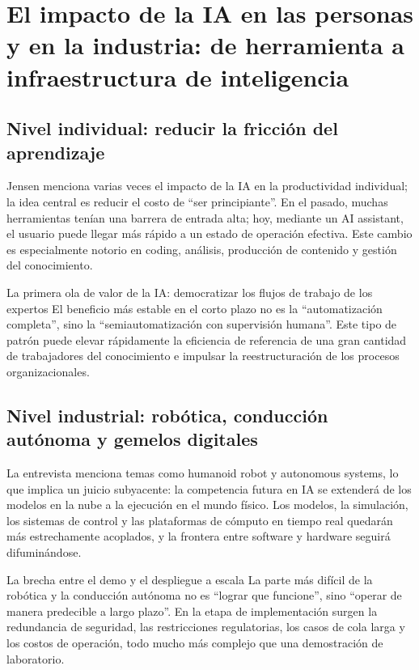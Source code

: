 \section{El impacto de la IA en las personas y en la industria: de herramienta a infraestructura de inteligencia}

\subsection{Nivel individual: reducir la fricción del aprendizaje}

Jensen menciona varias veces el impacto de la IA en la productividad individual; la idea central es reducir el costo de ``ser principiante''. En el pasado, muchas herramientas tenían una barrera de entrada alta; hoy, mediante un AI assistant, el usuario puede llegar más rápido a un estado de operación efectiva. Este cambio es especialmente notorio en coding, análisis, producción de contenido y gestión del conocimiento.

\begin{importantbox}{La primera ola de valor de la IA: democratizar los flujos de trabajo de los expertos}
El beneficio más estable en el corto plazo no es la ``automatización completa'', sino la ``semiautomatización con supervisión humana''. Este tipo de patrón puede elevar rápidamente la eficiencia de referencia de una gran cantidad de trabajadores del conocimiento e impulsar la reestructuración de los procesos organizacionales.
\end{importantbox}

\subsection{Nivel industrial: robótica, conducción autónoma y gemelos digitales}

La entrevista menciona temas como humanoid robot y autonomous systems, lo que implica un juicio subyacente: la competencia futura en IA se extenderá de los modelos en la nube a la ejecución en el mundo físico. Los modelos, la simulación, los sistemas de control y las plataformas de cómputo en tiempo real quedarán más estrechamente acoplados, y la frontera entre software y hardware seguirá difuminándose.

\begin{warningbox}{La brecha entre el demo y el despliegue a escala}
La parte más difícil de la robótica y la conducción autónoma no es ``lograr que funcione'', sino ``operar de manera predecible a largo plazo''. En la etapa de implementación surgen la redundancia de seguridad, las restricciones regulatorias, los casos de cola larga y los costos de operación, todo mucho más complejo que una demostración de laboratorio.
\end{warningbox}

